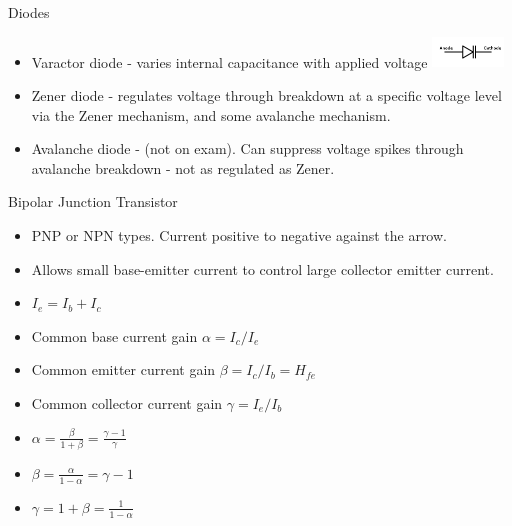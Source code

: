 \documentclass{beamer}
\begin{document}
\begin{frame}{Diodes}{}
\begin{itemize}
\item Varactor diode - varies internal capacitance with applied voltage \includegraphics[width=0.15\textwidth]{images/Varactor.png}

\item Zener diode - regulates voltage through breakdown at a specific voltage level via the Zener mechanism, and some avalanche mechanism.
\item Avalanche diode - (not on exam).  Can suppress voltage spikes through avalanche breakdown - not as regulated as Zener.
\end{itemize}
\end{frame}

\begin{frame}{Bipolar Junction Transistor}{}
\begin{itemize}
\item PNP or NPN types. Current positive to negative against the arrow.
\item Allows small base-emitter current to control large collector emitter current.
\item $I_e=I_b+I_c$
\item Common base current gain $\alpha=I_c/I_e$
\item Common emitter current gain $\beta=I_c/I_b=H_{fe}$
\item Common collector current gain $\gamma=I_e/I_b$
\item $\alpha=\frac{\beta}{1+\beta}=\frac{\gamma-1}{\gamma}$
\item $\beta=\frac{\alpha}{1-\alpha}=\gamma-1$
\item $\gamma=1+\beta=\frac{1}{1-\alpha}$
\end{itemize}
\end{frame}
\end{document}

